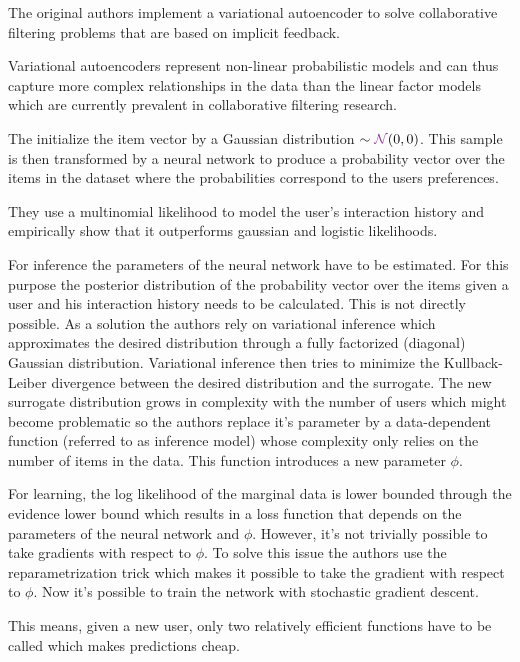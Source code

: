 The original authors implement a variational autoencoder to solve collaborative filtering problems that are based on implicit feedback.

Variational autoencoders represent non-linear probabilistic models and can thus capture more complex relationships in the data than the linear factor models which are currently prevalent in collaborative filtering research.

The initialize the item vector by a Gaussian distribution $\distas\Normaldist(0,0)$.
This sample is then transformed by a neural network to produce a probability vector over the items in the dataset where the
probabilities correspond to the users
preferences. 

They use a multinomial likelihood to model the user's interaction history and empirically show that it outperforms gaussian and logistic likelihoods. 

For inference the parameters of the neural network have to be estimated. For this purpose the posterior distribution of the probability
vector over the items given a user and his interaction history needs to be calculated. This is not directly possible. As a solution the authors rely on variational inference which approximates the desired distribution through a fully factorized (diagonal) Gaussian distribution. Variational inference then tries to minimize the Kullback-Leiber divergence between the desired distribution and the surrogate. The new surrogate distribution grows in complexity with the number of users which might become problematic so the authors replace it's parameter by a data-dependent function (referred to as inference model) whose complexity only relies on the number of items in the data. This function introduces a new parameter $\phi$.

For learning, the log likelihood of the marginal data is lower bounded through the evidence lower bound which results in a loss function that depends on the parameters of the neural network and $\phi$. However, it's not trivially possible to take gradients with respect to $\phi$. To solve this issue the authors use the reparametrization trick which makes it possible to take the gradient with respect to $\phi$. Now it's possible to train the network with stochastic gradient descent.

 This means, given a new user, only two relatively efficient functions have to be called which makes predictions cheap.

